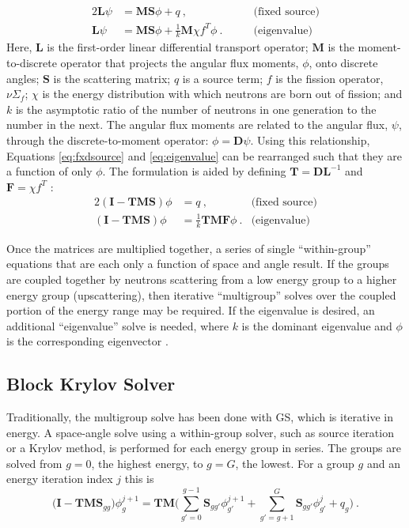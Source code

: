 \documentclass{article}                                                                           %
\newcommand{\Macro}{\ensuremath{\Sigma}}
\newcommand{\ve}[1]{\ensuremath{\mathbf{#1}}}
\begin{document}
%
\begin{alignat}{2}
  \ve{L}\psi &= \ve{MS}\phi + q \:, \qquad &\text{(fixed source)} \label{eq:fxdsource} \\
  \ve{L}\psi &= \ve{MS}\phi + \frac{1}{k}\ve{M}\chi f^{T}\phi \:. \qquad &\text{(eigenvalue)} 
  \label{eq:eigenvalue}
\end{alignat}
%
Here, $\ve{L}$ is the first-order linear differential transport operator; $\ve{M}$ is the moment-to-discrete operator that projects the angular flux moments, $\phi$, onto discrete angles; $\ve{S}$ is the scattering matrix; $q$ is a source term; $f$ is the fission operator, $\nu \Macro_{f}$; $\chi$ is the energy distribution with which neutrons are born out of fission; and $k$ is the asymptotic ratio of the number of neutrons in one generation to the number in the next. The angular flux moments are related to the angular flux, $\psi$, through the discrete-to-moment operator: $\phi = \mathbf{D} \psi$. Using this relationship, Equations \eqref{eq:fxdsource} and \eqref{eq:eigenvalue} can be rearranged such that they are a function of only $\phi$. The formulation is aided by defining $\ve{T} = \ve{DL}^{-1}$ and $\ve{F} = \chi f^{T}$ \cite{Evans2011}:
%
\begin{alignat}{2}
  (\ve{I} - \ve{TMS})\phi &= q \:, \qquad &\text{(fixed source)} \label{eq:OperatorFxdForm} \\
  (\ve{I} - \ve{TMS})\phi &= \frac{1}{k} \ve{TMF} \phi \:. &\text{(eigenvalue)} \label{eq:OperatorEvalForm}
\end{alignat}

Once the matrices are multiplied together, a series of single ``within-group'' equations that are each only a function of space and angle result. If the groups are coupled together by neutrons scattering from a low energy group to a higher energy group (upscattering), then iterative ``multigroup'' solves over the coupled portion of the energy range may be required. If the eigenvalue is desired, an additional ``eigenvalue'' solve is needed, where $k$ is the dominant eigenvalue and $\phi$ is the corresponding eigenvector \cite{Evans2009}.

\subsection{Block Krylov Solver}
\label{sec:blockkrylov}
Traditionally, the multigroup solve has been done with GS, which is iterative in energy. A space-angle solve using a within-group solver, such as source iteration or a Krylov method, is performed for each energy group in series. The groups are solved from $g=0$, the highest energy, to $g=G$, the lowest. For a group $g$ and an energy iteration index $j$ this is \cite{Evans2010}
%
\begin{equation}
  \bigl( \ve{I} - \ve{TMS}_{gg} \bigr) \phi^{j+1}_{g} = \ve{TM} \bigl( \sum_{g'=0}^{g-1}\ve{S}_{gg'}\phi^{j+1}_{g'} + \sum_{g'=g+1}^{G} \ve{S}_{gg'}\phi^{j}_{g'}  + q_{g} \bigr)  \:.
 \label{eq:up-GS}
\end{equation}
\end{document}
